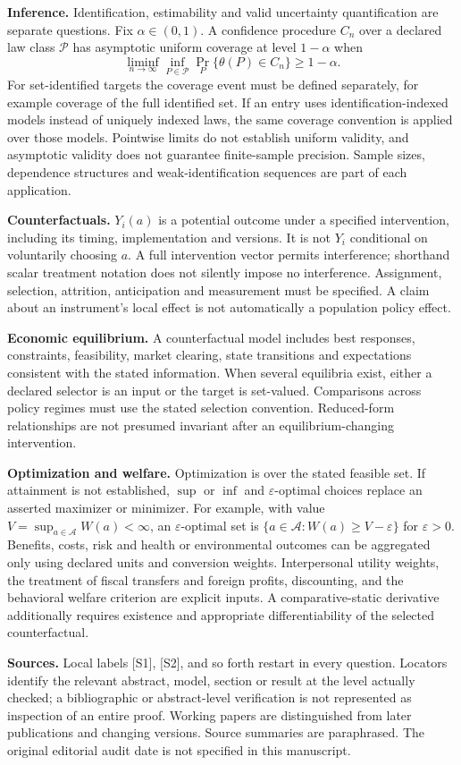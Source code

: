 \documentclass[11pt,a4paper]{article}
\begin{document}
\textbf{Inference.} Identification, estimability and valid uncertainty quantification are separate questions. Fix $\alpha\in(0,1)$. A confidence procedure $C_n$ over a declared law class $\mathcal P$ has asymptotic uniform coverage at level $1-\alpha$ when
\[
\liminf_{n\to\infty}\inf_{P\in\mathcal P}\Pr_P\{\theta(P)\in C_n\}\geq1-\alpha.
\]
For set-identified targets the coverage event must be defined separately, for example coverage of the full identified set. If an entry uses identification-indexed models instead of uniquely indexed laws, the same coverage convention is applied over those models. Pointwise limits do not establish uniform validity, and asymptotic validity does not guarantee finite-sample precision. Sample sizes, dependence structures and weak-identification sequences are part of each application.

\textbf{Counterfactuals.} $Y_i(a)$ is a potential outcome under a specified intervention, including its timing, implementation and versions. It is not $Y_i$ conditional on voluntarily choosing $a$. A full intervention vector permits interference; shorthand scalar treatment notation does not silently impose no interference. Assignment, selection, attrition, anticipation and measurement must be specified. A claim about an instrument's local effect is not automatically a population policy effect.

\textbf{Economic equilibrium.} A counterfactual model includes best responses, constraints, feasibility, market clearing, state transitions and expectations consistent with the stated information. When several equilibria exist, either a declared selector is an input or the target is set-valued. Comparisons across policy regimes must use the stated selection convention. Reduced-form relationships are not presumed invariant after an equilibrium-changing intervention.

\textbf{Optimization and welfare.} Optimization is over the stated feasible set. If attainment is not established, $\sup$ or $\inf$ and $\varepsilon$-optimal choices replace an asserted maximizer or minimizer. For example, with value $V=\sup_{a\in\mathcal A}W(a)<\infty$, an $\varepsilon$-optimal set is $\{a\in\mathcal A:W(a)\geq V-\varepsilon\}$ for $\varepsilon>0$. Benefits, costs, risk and health or environmental outcomes can be aggregated only using declared units and conversion weights. Interpersonal utility weights, the treatment of fiscal transfers and foreign profits, discounting, and the behavioral welfare criterion are explicit inputs. A comparative-static derivative additionally requires existence and appropriate differentiability of the selected counterfactual.

\textbf{Sources.} Local labels [S1], [S2], and so forth restart in every question. Locators identify the relevant abstract, model, section or result at the level actually checked; a bibliographic or abstract-level verification is not represented as inspection of an entire proof. Working papers are distinguished from later publications and changing versions. Source summaries are paraphrased. The original editorial audit date is not specified in this manuscript.
\end{document}
